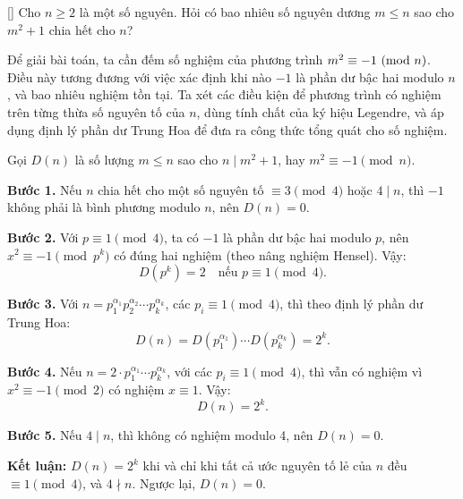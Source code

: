 \documentclass[../08-quadratic-residues.tex]{subfiles}
\begin{document}
\begin{example*}\label{example:MEMO-2015-T-P4}[\textbf{}]
	Cho \( n \ge 2 \) là một số nguyên. Hỏi có bao nhiêu số nguyên dương \( m \le n \) sao cho \( m^2 + 1 \) chia hết cho \( n \)?	
\end{example*}

\begin{story*}
	Để giải bài toán, ta cần đếm số nghiệm của phương trình \( m^2 \equiv -1 \ (\mathrm{mod}\ n) \). Điều này tương đương với việc xác định khi nào \( -1 \) là phần dư bậc hai modulo \( n \), và bao nhiêu nghiệm tồn tại. Ta xét các điều kiện để phương trình có nghiệm trên từng thừa số nguyên tố của \( n \), dùng tính chất của ký hiệu Legendre, và áp dụng định lý phần dư Trung Hoa để đưa ra công thức tổng quát cho số nghiệm.
\end{story*}

\bigbreak

\begin{soln}\footnotemark
	Gọi \( D(n) \) là số lượng \( m \le n \) sao cho \( n \mid m^2 + 1 \), hay \( m^2 \equiv -1 \pmod{n} \).  

	\textbf{Bước 1.} Nếu \( n \) chia hết cho một số nguyên tố \( \equiv 3 \pmod{4} \) hoặc \( 4 \mid n \), thì \( -1 \) không phải là bình phương modulo \( n \), nên \( D(n) = 0 \).  

	\textbf{Bước 2.} Với \( p \equiv 1 \pmod{4} \), ta có \( -1 \) là phần dư bậc hai modulo \( p \), nên \( x^2 \equiv -1 \pmod{p^k} \) có đúng hai nghiệm (theo nâng nghiệm Hensel). Vậy:
	\[
		D(p^k) = 2 \quad \text{nếu } p \equiv 1 \pmod{4}.
	\]

	\textbf{Bước 3.} Với \( n = p_1^{\alpha_1} p_2^{\alpha_2} \cdots p_k^{\alpha_k} \), các \( p_i \equiv 1 \pmod{4} \), thì theo định lý phần dư Trung Hoa:
	\[
		D(n) = D(p_1^{\alpha_1}) \cdots D(p_k^{\alpha_k}) = 2^k.
	\]

	\textbf{Bước 4.} Nếu \( n = 2 \cdot p_1^{\alpha_1} \cdots p_k^{\alpha_k} \), với các \( p_i \equiv 1 \pmod{4} \), thì vẫn có nghiệm vì \( x^2 \equiv -1 \pmod{2} \) có nghiệm \( x \equiv 1 \). Vậy:
	\[
		D(n) = 2^k.
	\]

	\textbf{Bước 5.} Nếu \( 4 \mid n \), thì không có nghiệm modulo 4, nên \( D(n) = 0 \).

	\textbf{Kết luận:} \( D(n) = 2^k \) khi và chỉ khi tất cả ước nguyên tố lẻ của \( n \) đều \( \equiv 1 \pmod{4} \), và \( 4 \nmid n \).  
	Ngược lại, \( D(n) = 0 \).
\end{soln}

\end{document}
